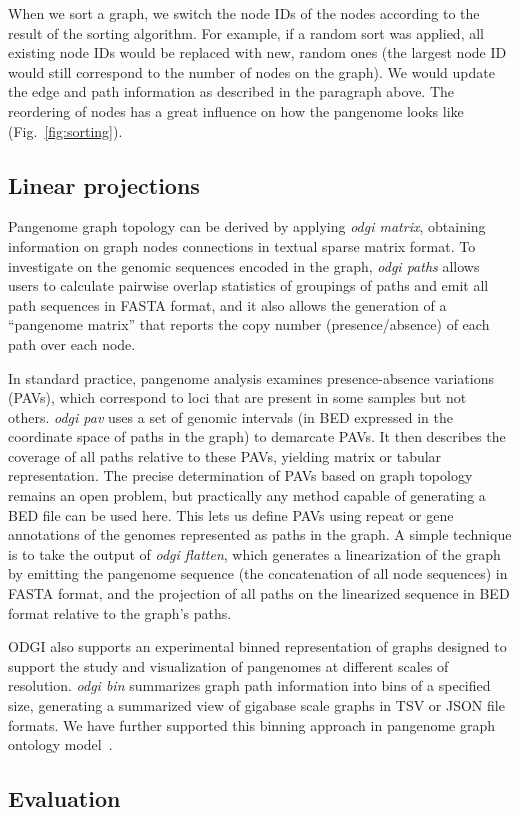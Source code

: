 \documentclass{bioinfo}
\begin{document}
When we sort a graph, we switch the node IDs of the nodes according to the result of the sorting algorithm. 
For example, if a random sort was applied, all existing node IDs would be replaced with new, random ones (the largest node ID would still correspond to the number of nodes on the graph).
We would update the edge and path information as described in the paragraph above.
The reordering of nodes has a great influence on how the pangenome looks like (Fig.~\ref{fig:sorting}).



\subsection{Linear projections}
\label{sec:supp_metrics}
Pangenome graph topology can be derived by applying \textit{odgi matrix}, obtaining information on graph nodes connections in textual sparse matrix format.
To investigate on the genomic sequences encoded in the graph, \textit{odgi paths} allows users to calculate pairwise overlap statistics of groupings of paths and emit all path sequences in FASTA format, and it also allows the generation of a ``pangenome matrix'' that reports the copy number (presence/absence) of each path over each node.

In standard practice, pangenome analysis examines presence-absence variations (PAVs), which correspond to loci that are present in some samples but not others.
\textit{odgi pav} uses a set of genomic intervals (in BED expressed in the coordinate space of paths in the graph) to demarcate PAVs.
It then describes the coverage of all paths relative to these PAVs, yielding matrix or tabular representation.
The precise determination of PAVs based on graph topology remains an open problem, but practically any method capable of generating a BED file can be used here.
This lets us define PAVs using repeat or gene annotations of the genomes represented as paths in the graph.
A simple technique is to take the output of \textit{odgi flatten}, which generates a linearization of the graph by emitting the pangenome sequence (the concatenation of all node sequences) in FASTA format, and the projection of all paths on the linearized sequence in BED format relative to the graph's paths.

ODGI also supports an experimental binned representation of graphs designed to support the study and visualization of pangenomes at different scales of resolution.
\textit{odgi bin} summarizes graph path information into bins of a specified size, generating a summarized view of gigabase scale graphs in TSV or JSON file formats.
We have further supported this binning approach in pangenome graph ontology model~\citep{Yokoyama2020}. %

\clearpage
\subsection{Evaluation}

\clearpage

\clearpage

\clearpage

\clearpage

\end{document}
